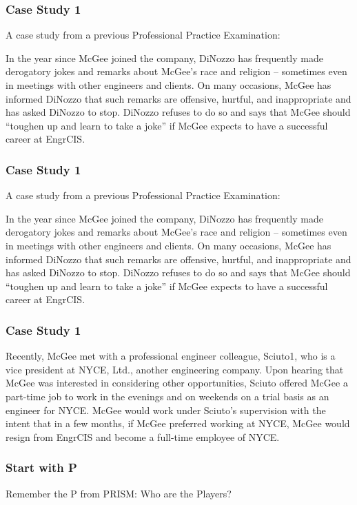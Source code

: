 \begin{frame}
\frametitle{Case Study 1}

A case study from a previous Professional Practice Examination:


In the year since McGee joined the company, DiNozzo has frequently made derogatory jokes and remarks about McGee's race and religion -- sometimes even in meetings with other engineers and clients. On many occasions, McGee has informed DiNozzo that such remarks are offensive, hurtful, and inappropriate and has asked DiNozzo to stop.  DiNozzo refuses to do so and says that McGee should ``toughen up and learn to take a joke'' if McGee expects to have a successful career at EngrCIS. 
\end{frame}

\begin{frame}
\frametitle{Case Study 1}

A case study from a previous Professional Practice Examination:


In the year since McGee joined the company, DiNozzo has frequently made derogatory jokes and remarks about McGee's race and religion -- sometimes even in meetings with other engineers and clients. On many occasions, McGee has informed DiNozzo that such remarks are offensive, hurtful, and inappropriate and has asked DiNozzo to stop.  DiNozzo refuses to do so and says that McGee should ``toughen up and learn to take a joke'' if McGee expects to have a successful career at EngrCIS. 
\end{frame}



\begin{frame}
\frametitle{Case Study 1}


Recently, McGee met with a professional engineer colleague, Sciuto1, who is a vice president at NYCE, Ltd., another engineering company.  Upon hearing that McGee was interested in considering other opportunities, Sciuto offered McGee a part-time job to work in the evenings and on weekends on a trial basis as an engineer for NYCE.  McGee would work under Sciuto's supervision with the intent that in a few months, if McGee preferred working at NYCE, McGee would resign from EngrCIS and become a full-time employee of NYCE.



\end{frame}



\begin{frame}
\frametitle{Start with P}

Remember the P from PRISM: Who are the Players?


\end{frame}


